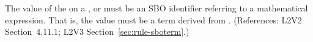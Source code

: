 The value of the   on a \AlgebraicRule, \RateRule or
\AssignmentRule must be an SBO identifier referring to a mathematical
expression.  That is, the value must be a term derived from
\sbomathformula.  (References: L2V2 Section~4.11.1;
L2V3 Section~\ref{sec:rule-sboterm}.)
